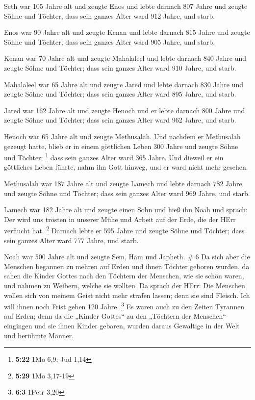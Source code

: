  Seth war 105 Jahre alt und zeugte Enos  und
lebte darnach 807 Jahre und zeugte Söhne und Töchter;  dass
sein ganzes Alter ward 912 Jahre, und starb.

 Enos war 90 Jahre alt und zeugte Kenan  und
lebte darnach 815 Jahre und zeugte Söhne und Töchter;  dass
sein ganzes Alter ward 905 Jahre, und starb.

 Kenan war 70 Jahre alt und zeugte Mahalaleel 
und lebte darnach 840 Jahre und zeugte Söhne und Töchter; 
dass sein ganzes Alter ward 910 Jahre, und starb.

 Mahalaleel war 65 Jahre alt und zeugte Jared 
und lebte darnach 830 Jahre und zeugte Söhne und Töchter; 
dass sein ganzes Alter ward 895 Jahre, und starb.

 Jared war 162 Jahre alt und zeugte Henoch 
und er lebte darnach 800 Jahre und zeugte Söhne und Töchter;
 dass sein ganzes Alter ward 962 Jahre, und starb.

 Henoch war 65 Jahre alt und zeugte Methusalah.
 Und nachdem er Methusalah gezeugt hatte, blieb er in einem
göttlichen Leben 300 Jahre und zeugte Söhne und Töchter; \footnote{\textbf{5:22}
  1Mo 6,9; Jud 1,14}  dass sein ganzes Alter ward 365
Jahre.  Und dieweil er ein göttliches Leben führte, nahm
ihn Gott hinweg, und er ward nicht mehr gesehen.

 Methusalah war 187 Jahre alt und zeugte Lamech
 und lebte darnach 782 Jahre und zeugte Söhne und Töchter;
 dass sein ganzes Alter ward 969 Jahre, und starb.

 Lamech war 182 Jahre alt und zeugte einen Sohn
 und hieß ihn Noah und sprach: Der wird uns trösten in
unserer Mühe und Arbeit auf der Erde, die der HErr verflucht hat.
\footnote{\textbf{5:29} 1Mo 3,17-19}  Darnach lebte er 595
Jahre und zeugte Söhne und Töchter;  dass sein ganzes Alter
ward 777 Jahre, und starb.

 Noah war 500 Jahre alt und zeugte Sem, Ham und Japheth. \#
6  Da sich aber die Menschen begannen zu mehren auf Erden
und ihnen Töchter geboren wurden,  da sahen die Kinder
Gottes nach den Töchtern der Menschen, wie sie schön waren, und nahmen
zu Weibern, welche sie wollten.  Da sprach der HErr: Die
Menschen wollen sich von meinem Geist nicht mehr strafen lassen; denn
sie sind Fleisch. Ich will ihnen noch Frist geben 120 Jahre. \footnote{\textbf{6:3}
  1Petr 3,20}  Es waren auch zu den Zeiten Tyrannen auf
Erden; denn da die „Kinder Gottes`` zu den „Töchtern der Menschen``
eingingen und sie ihnen Kinder gebaren, wurden daraus Gewaltige in der
Welt und berühmte Männer.

